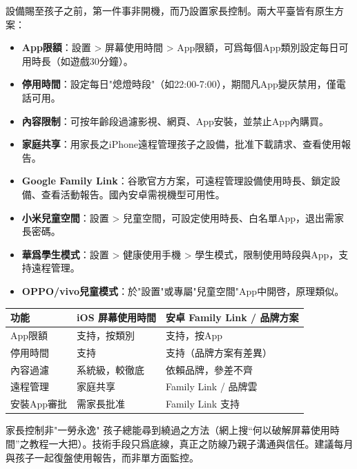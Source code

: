 
設備賜至孩子之前，第一件事非開機，而乃設置家長控制。兩大平臺皆有原生方案：


\begin{itemize}
  \item \textbf{App限額}：設置 > 屏幕使用時間 > App限額，可爲每個App類別設定每日可用時長（如遊戲30分鐘）。
  \item \textbf{停用時間}：設定每日"熄燈時段"（如22:00-7:00），期間凡App變灰禁用，僅電話可用。
  \item \textbf{內容限制}：可按年齡段過濾影視、網頁、App安裝，並禁止App內購買。
  \item \textbf{家庭共享}：用家長之iPhone遠程管理孩子之設備，批准下載請求、查看使用報告。
\end{itemize}


\begin{itemize}
  \item \textbf{Google Family Link}：谷歌官方方案，可遠程管理設備使用時長、鎖定設備、查看活動報告。國內安卓需視機型可用性。
  \item \textbf{小米兒童空間}：設置 > 兒童空間，可設定使用時長、白名單App，退出需家長密碼。
  \item \textbf{華爲學生模式}：設置 > 健康使用手機 > 學生模式，限制使用時段與App，支持遠程管理。
  \item \textbf{OPPO/vivo兒童模式}：於"設置"或專屬"兒童空間"App中開啓，原理類似。
\end{itemize}

\begin{center}
\begin{tabularx}{\linewidth}{|X|X|X|}
\hline
\textbf{功能} & \textbf{iOS 屏幕使用時間} & \textbf{安卓 Family Link / 品牌方案} \tabularnewline
\hline
App限額 & 支持，按類別 & 支持，按App \tabularnewline
停用時間 & 支持 & 支持（品牌方案有差異） \tabularnewline
內容過濾 & 系統級，較徹底 & 依賴品牌，參差不齊 \tabularnewline
遠程管理 & 家庭共享 & Family Link / 品牌雲 \tabularnewline
安裝App審批 & 需家長批准 & Family Link 支持 \tabularnewline
\hline
\end{tabularx}
\end{center}

\begin{tcbwarn}{家長控制非"一勞永逸"}
孩子總能尋到繞過之方法（網上搜“何以破解屏幕使用時間”之教程一大把）。技術手段只爲底線，真正之防線乃親子溝通與信任。建議每月與孩子一起復盤使用報告，而非單方面監控。

\end{tcbwarn}

